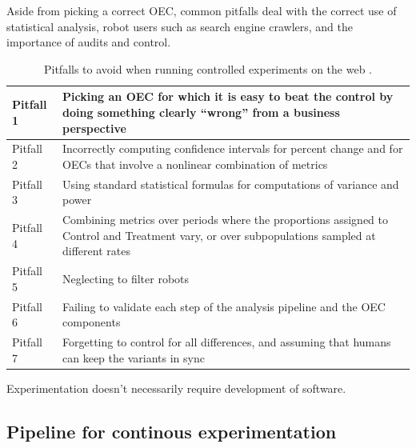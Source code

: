 \documentclass[conference]{IEEEtran}
\begin{document}
Aside from picking a correct OEC, common pitfalls deal with the correct use of statistical analysis, robot users such as search engine crawlers, and the importance of audits and control.
\begin{center}
\begin{table}[htb]
    \begin{tabular}{ | p{1cm} | p{6cm} |}
    \hline
	Pitfall 1 & Picking an OEC for which it is easy to beat the control by doing something clearly “wrong” from a business perspective \\ \hline
	Pitfall 2 & Incorrectly computing confidence intervals for percent change and for OECs that involve a nonlinear combination of metrics \\ \hline
	Pitfall 3 & Using standard statistical formulas for computations of variance and power \\ \hline
	Pitfall 4 & Combining metrics over periods where the proportions assigned to Control and Treatment vary, or over subpopulations sampled at different rates \\ \hline
	Pitfall 5 & Neglecting to filter robots \\ \hline
	Pitfall 6 & Failing to validate each step of the analysis pipeline and the OEC components \\ \hline
	Pitfall 7 & Forgetting to control for all differences, and assuming that humans can keep the variants in sync \\ \hline
    \end{tabular}
    \caption{Pitfalls to avoid when running controlled experiments on the web \cite{crook2009seven}.}
    \end{table}
\end{center}

Experimentation doesn't necessarily require development of software.


\subsection{Pipeline for continous experimentation}
\end{document}
